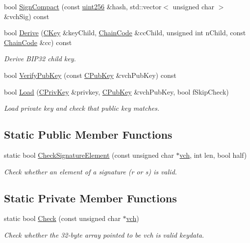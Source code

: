 \begin{DoxyCompactItemize}
\item 
bool \mbox{\hyperlink{class_c_key_afe77d80889aa68e92e6882e75424cfb8}{Sign\+Compact}} (const \mbox{\hyperlink{classuint256}{uint256}} \&hash, std\+::vector$<$ unsigned char $>$ \&vch\+Sig) const
\item 
bool \mbox{\hyperlink{class_c_key_ae79008cec2eb799a2efd37e010996acf}{Derive}} (\mbox{\hyperlink{class_c_key}{C\+Key}} \&key\+Child, \mbox{\hyperlink{hash_8h_aa201a9867f780a040c7af908e0a85db3}{Chain\+Code}} \&cc\+Child, unsigned int n\+Child, const \mbox{\hyperlink{hash_8h_aa201a9867f780a040c7af908e0a85db3}{Chain\+Code}} \&cc) const
\begin{DoxyCompactList}\small\item\em Derive B\+I\+P32 child key. \end{DoxyCompactList}\item 
bool \mbox{\hyperlink{class_c_key_ac53425b8d0f89067bce781c485101b20}{Verify\+Pub\+Key}} (const \mbox{\hyperlink{class_c_pub_key}{C\+Pub\+Key}} \&vch\+Pub\+Key) const
\item 
bool \mbox{\hyperlink{class_c_key_a141751588f8bfe5f1b6fc27f4e64b63f}{Load}} (\mbox{\hyperlink{key_8h_a1da569b8b6e5b3fa1196cc1b877e7f54}{C\+Priv\+Key}} \&privkey, \mbox{\hyperlink{class_c_pub_key}{C\+Pub\+Key}} \&vch\+Pub\+Key, bool f\+Skip\+Check)
\begin{DoxyCompactList}\small\item\em Load private key and check that public key matches. \end{DoxyCompactList}\end{DoxyCompactItemize}
\subsection*{Static Public Member Functions}
\begin{DoxyCompactItemize}
\item 
static bool \mbox{\hyperlink{class_c_key_a625c363d9adfbd4dda22f3a67a898cf4}{Check\+Signature\+Element}} (const unsigned char $\ast$\mbox{\hyperlink{class_c_key_a07f9e2b043670dfbaa9b7b4e782ed116}{vch}}, int len, bool half)
\begin{DoxyCompactList}\small\item\em Check whether an element of a signature (r or s) is valid. \end{DoxyCompactList}\end{DoxyCompactItemize}
\subsection*{Static Private Member Functions}
\begin{DoxyCompactItemize}
\item 
static bool \mbox{\hyperlink{class_c_key_acec869bc75fa8f4d619ab025d367a97c}{Check}} (const unsigned char $\ast$\mbox{\hyperlink{class_c_key_a07f9e2b043670dfbaa9b7b4e782ed116}{vch}})
\begin{DoxyCompactList}\small\item\em Check whether the 32-\/byte array pointed to be vch is valid keydata. \end{DoxyCompactList}\end{DoxyCompactItemize}
